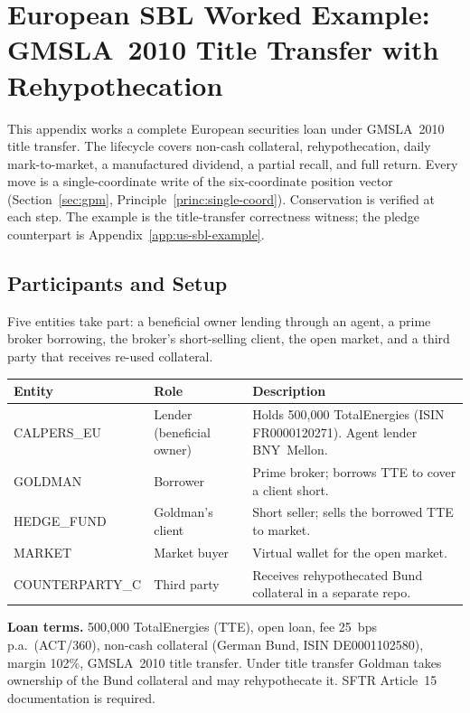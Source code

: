 \section{European SBL Worked Example: GMSLA~2010 Title Transfer with Rehypothecation}
\label{app:eu-sbl-example}

This appendix works a complete European securities loan under GMSLA~2010 title transfer. The lifecycle covers non-cash collateral, rehypothecation, daily mark-to-market, a manufactured dividend, a partial recall, and full return. Every move is a single-coordinate write of the six-coordinate position vector (Section~\ref{sec:gpm}, Principle~\ref{princ:single-coord}). Conservation is verified at each step. The example is the title-transfer correctness witness; the pledge counterpart is Appendix~\ref{app:us-sbl-example}.

\subsection{Participants and Setup}

Five entities take part: a beneficial owner lending through an agent, a prime broker borrowing, the broker's short-selling client, the open market, and a third party that receives re-used collateral.

\begin{center}\small
\begin{tabular}{l l p{7.2cm}}
\toprule
\textbf{Entity} & \textbf{Role} & \textbf{Description} \\
\midrule
CALPERS\_EU & Lender (beneficial owner) & Holds 500{,}000 TotalEnergies (ISIN FR0000120271). Agent lender BNY~Mellon. \\
GOLDMAN & Borrower & Prime broker; borrows TTE to cover a client short. \\
HEDGE\_FUND & Goldman's client & Short seller; sells the borrowed TTE to market. \\
MARKET & Market buyer & Virtual wallet for the open market. \\
COUNTERPARTY\_C & Third party & Receives rehypothecated Bund collateral in a separate repo. \\
\bottomrule
\end{tabular}
\end{center}

\noindent\textbf{Loan terms.} 500{,}000 TotalEnergies (TTE), open loan, fee 25~bps p.a.\ (ACT/360), non-cash collateral (German Bund, ISIN DE0001102580), margin 102\%, GMSLA~2010 title transfer. Under title transfer Goldman takes ownership of the Bund collateral and may rehypothecate it. SFTR Article~15 documentation is required.

